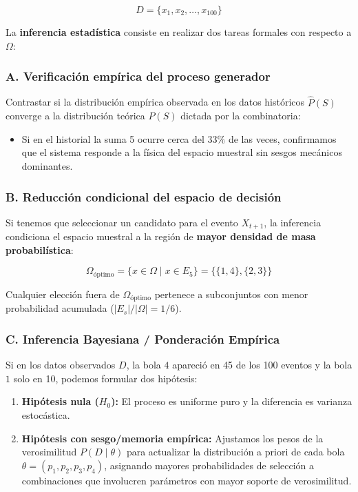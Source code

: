 \documentclass[11pt,a4paper]{article}
\begin{document}
$$D = \{x_1, x_2, \dots, x_{100}\}$$

La \textbf{inferencia estadística} consiste en realizar dos tareas formales con respecto a $\Omega$:

\subsubsection*{A. Verificación empírica del proceso generador}
Contrastar si la distribución empírica observada en los datos históricos $\hat{P}(S)$ converge a la distribución teórica $P(S)$ dictada por la combinatoria:
\begin{itemize}
    \item Si en el historial la suma 5 ocurre cerca del $33\%$ de las veces, confirmamos que el sistema responde a la física del espacio muestral sin sesgos mecánicos dominantes.
\end{itemize}

\subsubsection*{B. Reducción condicional del espacio de decisión}
Si tenemos que seleccionar un candidato para el evento $X_{t+1}$, la inferencia condiciona el espacio muestral a la región de \textbf{mayor densidad de masa probabilística}:

$$\Omega_{\text{óptimo}} = \{ x \in \Omega \mid x \in E_5 \} = \big\{ \{1,4\}, \{2,3\} \big\}$$

Cualquier elección fuera de $\Omega_{\text{óptimo}}$ pertenece a subconjuntos con menor probabilidad acumulada ($|E_s|/|\Omega| = 1/6$).

\subsubsection*{C. Inferencia Bayesiana / Ponderación Empírica}
Si en los datos observados $D$, la bola $4$ apareció en 45 de los 100 eventos y la bola $1$ solo en 10, podemos formular dos hipótesis:
\begin{enumerate}
    \item \textbf{Hipótesis nula ($H_0$):} El proceso es uniforme puro y la diferencia es varianza estocástica.
    \item \textbf{Hipótesis con sesgo/memoria empírica:} Ajustamos los pesos de la verosimilitud $P(D \mid \theta)$ para actualizar la distribución a priori de cada bola $\theta = (p_1, p_2, p_3, p_4)$, asignando mayores probabilidades de selección a combinaciones que involucren parámetros con mayor soporte de verosimilitud.
\end{enumerate}
\end{document}
